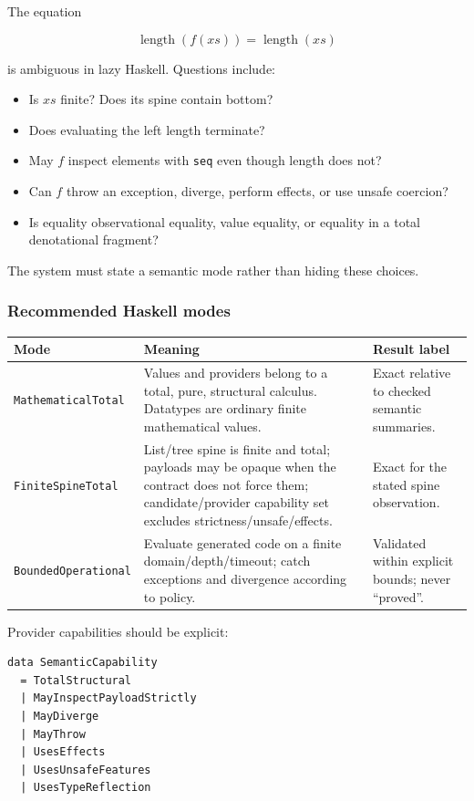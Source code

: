 \documentclass[11pt,oneside]{article}
\newcommand{\code}[1]{\texttt{#1}}
\begin{document}
The equation

\[
  \operatorname{length}(f(xs))=\operatorname{length}(xs)
\]

is ambiguous in lazy Haskell. Questions include:

\begin{itemize}
  \item Is $xs$ finite? Does its spine contain bottom?
  \item Does evaluating the left length terminate?
  \item May $f$ inspect elements with \code{seq} even though length does not?
  \item Can $f$ throw an exception, diverge, perform effects, or use unsafe coercion?
  \item Is equality observational equality, value equality, or equality in a total
        denotational fragment?
\end{itemize}

The system must state a semantic mode rather than hiding these choices.

\subsubsection{Recommended Haskell modes}

\begin{longtable}{@{}p{}p{}p{}@{}}
\toprule
\textbf{Mode} & \textbf{Meaning} & \textbf{Result label} \\
\midrule
\endhead
\code{MathematicalTotal} & Values and providers belong to a total, pure,
structural calculus. Datatypes are ordinary finite mathematical values. & Exact relative
to checked semantic summaries. \\
\code{FiniteSpineTotal} & List/tree spine is finite and total; payloads may be opaque
when the contract does not force them; candidate/provider capability set excludes
strictness/unsafe/effects. & Exact for the stated spine observation. \\
\code{BoundedOperational} & Evaluate generated code on a finite domain/depth/timeout;
catch exceptions and divergence according to policy. & Validated within explicit
bounds; never ``proved''. \\
\bottomrule
\end{longtable}

Provider capabilities should be explicit:

\begin{lstlisting}[language=HaskellExt]
data SemanticCapability
  = TotalStructural
  | MayInspectPayloadStrictly
  | MayDiverge
  | MayThrow
  | UsesEffects
  | UsesUnsafeFeatures
  | UsesTypeReflection
\end{lstlisting}
\end{document}
